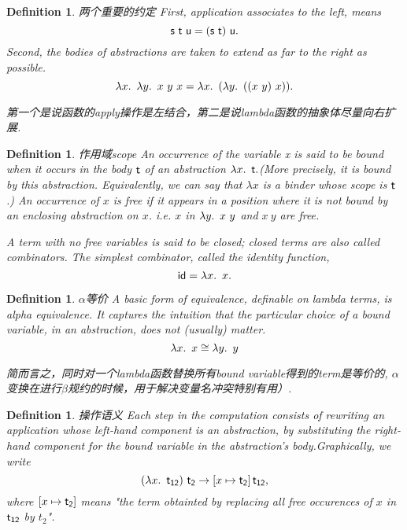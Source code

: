 \documentclass{article}
\theoremstyle{plain}
\newtheorem{definition}[theorem]{Definition}
\theoremstyle{nonumberplain}
\newcommand{\lam}[2]{\ensuremath{\lambda #1\ldotp~ #2}} %
\newcommand{\term}[1]{\ensuremath\mathsf{#1}}
\begin{document}
\begin{definition}
\rm {\color{red}两个重要的约定} First, application associates to the left, means
$$
\term{s}~\term{t}~\term{u} = (\term{s}~\term{t})~\term{u}.
$$
Second, the bodies of abstractions are taken to extend as far to the right
as possible.
$$
\lam{x}{\lam{y}{x~y~x}} = \lam{x}{(\lam{y}{((x~y)~x)})}.
$$

{\color{blue} 第一个是说函数的apply操作是左结合，第二是说lambda函数的抽象体尽量向右扩展}.
\end{definition}

\begin{definition}
\rm {\color{red} 作用域scope} An occurrence of the variable x is said to be {\color{red} bound} when it occurs in the body $\term{t}$ of an abstraction $\lam{x}{\term{t}}.$(More precisely, it is bound by this abstraction.
Equivalently, we can say that $\lambda x$ is a binder whose scope is $\term{t}$.) An occurrence of $x$ is {\color{red} free} if it appears in a position where it is not bound by an enclosing abstraction on $x$. i.e. $x$ in $\lam{y}{x\ y}$ and $x\ y$ are free. 

A term with no free variables is said to be {\color{red} closed}; closed terms are also called {\color{red}combinators}. The simplest combinator, called the identity function,
$$
\term{id} = \lam{x}{x}.
$$
\end{definition}

\begin{definition}
\rm {\color{red} $\alpha$等价} A basic form of equivalence, definable on lambda terms, is alpha equivalence. It captures the intuition that the particular choice of a bound variable, in an abstraction, does not (usually) matter. 
$$
\lam{x}{x} \cong \lam{y}{y}
$$

{\color{blue} 简而言之，同时对一个lambda函数替换所有bound variable得到的term是等价的, $\alpha$变换在进行$\beta$规约的时候，用于解决变量名冲突特别有用）}.
\end{definition}

\begin{definition}
\rm {\color{red} 操作语义} Each step in the computation consists of rewriting an application whose left-hand component is an abstraction, by substituting the right-hand component for the bound variable in the abstraction's body.Graphically, we write
$$
(\lam{x}{\term{t_{12}}})~\term{t_2} \rightarrow \left[ x \mapsto \term{t_2} \right] \term{t_{12}},
$$
where $\left[ x \mapsto \term{t_2} \right]$ means "the term obtainted by replacing all free occurences of $x$ in $\term{t_{12}}$ by $t_2$". 
\end{definition}
\end{document}
